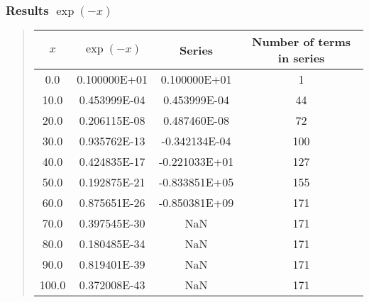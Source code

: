 \documentclass[handout]{beamer}
\newenvironment{block_mdfboxadmon}[1][]{\begin{block}{#1}}{\end{block}}
\begin{document}
\begin{frame}
\frametitle{Results $\exp{(-x)}$}

\begin{block_mdfboxadmon}


\begin{quote}
\begin{tabular}{cccc}
\hline
\multicolumn{1}{c}{ $x$ } & \multicolumn{1}{c}{ $\exp{(-x)}$ } & \multicolumn{1}{c}{ Series } & \multicolumn{1}{c}{ Number of terms in series } \\
\hline
0.0                       & 0.100000E+01              & 0.100000E+01              & 1                         \\
10.0                      & 0.453999E-04              & 0.453999E-04              & 44                        \\
20.0                      & 0.206115E-08              & 0.487460E-08              & 72                        \\
30.0                      & 0.935762E-13              & -0.342134E-04             & 100                       \\
40.0                      & 0.424835E-17              & -0.221033E+01             & 127                       \\
50.0                      & 0.192875E-21              & -0.833851E+05             & 155                       \\
60.0                      & 0.875651E-26              & -0.850381E+09             & 171                       \\
70.0                      & 0.397545E-30              & NaN                       & 171                       \\
80.0                      & 0.180485E-34              & NaN                       & 171                       \\
90.0                      & 0.819401E-39              & NaN                       & 171                       \\
100.0                     & 0.372008E-43              & NaN                       & 171                       \\
\hline
\end{tabular}
\end{quote}

\noindent
\end{block_mdfboxadmon}
\end{frame}
\end{document}
